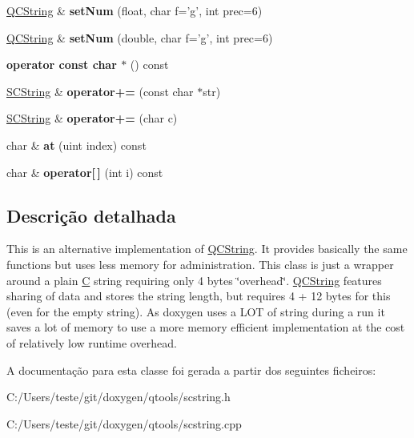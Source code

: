 \begin{DoxyCompactItemize}
\item 
\hypertarget{class_s_c_string_ac12da65c32e9f7ee55af657fbbbf6dbe}{\hyperlink{class_q_c_string}{Q\-C\-String} \& {\bfseries set\-Num} (float, char f='g', int prec=6)}\label{class_s_c_string_ac12da65c32e9f7ee55af657fbbbf6dbe}

\item 
\hypertarget{class_s_c_string_a15c2915cb5f62ec50a0a0207064bbcf6}{\hyperlink{class_q_c_string}{Q\-C\-String} \& {\bfseries set\-Num} (double, char f='g', int prec=6)}\label{class_s_c_string_a15c2915cb5f62ec50a0a0207064bbcf6}

\item 
\hypertarget{class_s_c_string_abdd0820f8401e11e09a1e92ab7f4d864}{{\bfseries operator const char $\ast$} () const }\label{class_s_c_string_abdd0820f8401e11e09a1e92ab7f4d864}

\item 
\hypertarget{class_s_c_string_a86fd377be3dee0acc3bd3f5db1d7d07b}{\hyperlink{class_s_c_string}{S\-C\-String} \& {\bfseries operator+=} (const char $\ast$str)}\label{class_s_c_string_a86fd377be3dee0acc3bd3f5db1d7d07b}

\item 
\hypertarget{class_s_c_string_af6fc8effa2fd1a56624cfb52f3ff2646}{\hyperlink{class_s_c_string}{S\-C\-String} \& {\bfseries operator+=} (char c)}\label{class_s_c_string_af6fc8effa2fd1a56624cfb52f3ff2646}

\item 
\hypertarget{class_s_c_string_a6e0620792d6df1c9d4c2de6fcc43d96f}{char \& {\bfseries at} (uint index) const }\label{class_s_c_string_a6e0620792d6df1c9d4c2de6fcc43d96f}

\item 
\hypertarget{class_s_c_string_aa26690d818962b4f4043781f42d6b350}{char \& {\bfseries operator\mbox{[}$\,$\mbox{]}} (int i) const }\label{class_s_c_string_aa26690d818962b4f4043781f42d6b350}

\end{DoxyCompactItemize}


\subsection{Descrição detalhada}
This is an alternative implementation of \hyperlink{class_q_c_string}{Q\-C\-String}. It provides basically the same functions but uses less memory for administration. This class is just a wrapper around a plain \hyperlink{class_c}{C} string requiring only 4 bytes \char`\"{}overhead\char`\"{}. \hyperlink{class_q_c_string}{Q\-C\-String} features sharing of data and stores the string length, but requires 4 + 12 bytes for this (even for the empty string). As doxygen uses a L\-O\-T of string during a run it saves a lot of memory to use a more memory efficient implementation at the cost of relatively low runtime overhead. 

A documentação para esta classe foi gerada a partir dos seguintes ficheiros\-:\begin{DoxyCompactItemize}
\item 
C\-:/\-Users/teste/git/doxygen/qtools/scstring.\-h\item 
C\-:/\-Users/teste/git/doxygen/qtools/scstring.\-cpp\end{DoxyCompactItemize}
